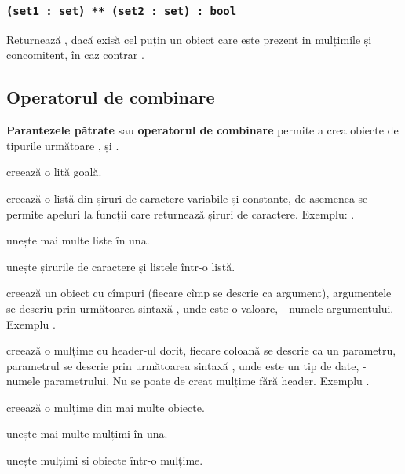 \subsubsection{\lstinline|(set1 : set) ** (set2 : set) : bool|}

Returnează \true, dacă exisă cel puțin un obiect care este prezent in mulțimile  și  concomitent, în caz contrar \false.

\subsection{Operatorul de combinare}

{\bf Parantezele pătrate} sau {\bf operatorul de combinare} permite a crea obiecte de tipurile următoare \listtype{}, \set{} și \object{}.

 creează o lită goală.

 creează o listă din șiruri de caractere variabile și constante, de asemenea se permite apeluri la funcții care returnează șiruri de caractere. Exemplu: \code{["a", "b", "c"]}.

 unește mai multe liste în una.

 unește șirurile de caractere și listele într-o listă.

 creează un obiect cu cîmpuri (fiecare cîmp se descrie ca argument), argumentele se descriu prin următoarea sintaxă , unde  este o valoare,  - numele argumentului. Exemplu \code{[number = 2, str = "str"]}.

 creează o mulțime cu header-ul dorit, fiecare coloană se descrie ca un parametru, parametrul se descrie prin următoarea sintaxă , unde  este un tip de date,  - numele parametrului. Nu se poate de creat mulțime fără header. Exemplu .

 creează o mulțime din mai multe obiecte.

 unește mai multe mulțimi în una.

 unește mulțimi si obiecte într-o mulțime.

